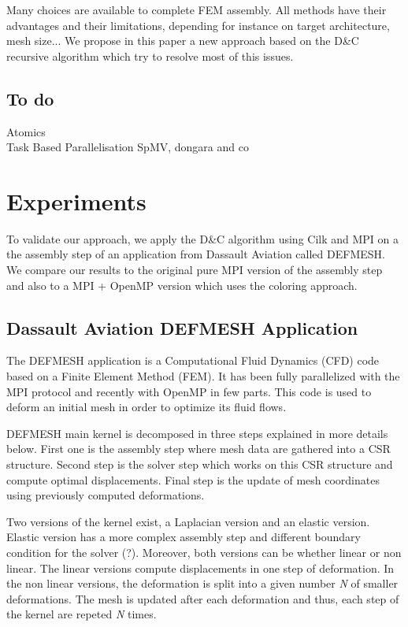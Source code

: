 \documentclass{IOS-Book-Article}
\begin{document}
Many choices are available to complete FEM assembly. All methods have their advantages and their limitations, depending for instance on target architecture, mesh size...
We propose in this paper a new approach based on the D\&C recursive algorithm which try to resolve most of this issues.

\subsection{To do}
Atomics\\
Task Based Parallelisation SpMV, dongara and co \cite{MPI_task}\\

\section{Experiments}
To validate our approach, we apply the D\&C algorithm using Cilk and MPI on a the assembly step of an application from Dassault Aviation called DEFMESH.
We compare our results to the original pure MPI version of the assembly step and also to a MPI + OpenMP version which uses the coloring approach.

\subsection{Dassault Aviation DEFMESH Application}
The DEFMESH application is a Computational Fluid Dynamics (CFD) code based on a Finite Element Method (FEM).
It has been fully parallelized with the MPI protocol and recently with OpenMP in few parts.
This code is used to deform an initial mesh in order to optimize its fluid flows.

DEFMESH main kernel is decomposed in three steps explained in more details below.
First one is the assembly step where mesh data are gathered into a CSR structure.
Second step is the solver step which works on this CSR structure and compute optimal displacements.
Final step is the update of mesh coordinates using previously computed deformations.

Two versions of the kernel exist, a Laplacian version and an elastic version. Elastic version has a more complex assembly step and different boundary condition for the solver (?).
Moreover, both versions can be whether linear or non linear.
The linear versions compute displacements in one step of deformation. In the non linear versions, the deformation is split into a given number \emph{N} of smaller deformations.
The mesh is updated after each deformation and thus, each step of the kernel are repeted \emph{N} times.
\end{document}
